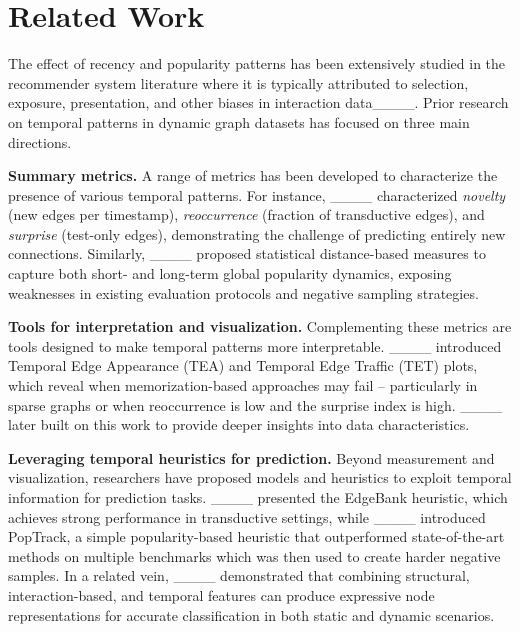 \section{Related Work}
The effect of recency and popularity patterns has been extensively studied in the recommender system literature where it is typically attributed to selection, exposure, presentation, and other biases in interaction data____. Prior research on temporal patterns in dynamic graph datasets has focused on three main directions.

\textbf{Summary metrics.} A range of metrics has been developed to characterize the presence of various temporal patterns. For instance, ____ characterized \textit{novelty} (new edges per timestamp), \textit{reoccurrence} (fraction of transductive edges), and \textit{surprise} (test-only edges), demonstrating the challenge of predicting entirely new connections. Similarly, ____ proposed statistical distance-based measures to capture both short- and long-term global popularity dynamics, exposing weaknesses in existing evaluation protocols and negative sampling strategies.

\textbf{Tools for interpretation and visualization.} Complementing these metrics are tools designed to make temporal patterns more interpretable. ____ introduced Temporal Edge Appearance (TEA) and Temporal Edge Traffic (TET) plots, which reveal when memorization-based approaches may fail -- particularly in sparse graphs or when reoccurrence is low and the surprise index is high. ____ later built on this work to provide deeper insights into data characteristics.

\textbf{Leveraging temporal heuristics for prediction.} Beyond measurement and visualization, researchers have proposed models and heuristics to exploit temporal information for prediction tasks. ____ presented the EdgeBank heuristic, which achieves strong performance in transductive settings, while ____ introduced PopTrack, a simple popularity-based heuristic that outperformed state-of-the-art methods on multiple benchmarks which was then used to create harder negative samples. In a related vein, ____ demonstrated that combining structural, interaction-based, and temporal features can produce expressive node representations for accurate classification in both static and dynamic scenarios.%